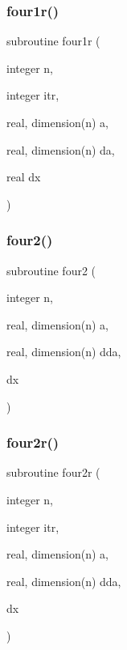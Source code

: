 \mbox{\label{sfft_8f_a5f93a60e103ea341eb2a9178a4914bf5}} 
\subsubsection{\texorpdfstring{four1r()}{four1r()}}
{\footnotesize\ttfamily subroutine four1r (\begin{DoxyParamCaption}\item[{integer}]{n,  }\item[{integer}]{itr,  }\item[{real, dimension(n)}]{a,  }\item[{real, dimension(n)}]{da,  }\item[{real}]{dx }\end{DoxyParamCaption})}

\mbox{\label{sfft_8f_adf0e24e539f85736a86372829a8cb19e}} 
\subsubsection{\texorpdfstring{four2()}{four2()}}
{\footnotesize\ttfamily subroutine four2 (\begin{DoxyParamCaption}\item[{integer}]{n,  }\item[{real, dimension(n)}]{a,  }\item[{real, dimension(n)}]{dda,  }\item[{}]{dx }\end{DoxyParamCaption})}

\mbox{\label{sfft_8f_aaaebfce61bc0b8ffaddcadfb2d679458}} 
\subsubsection{\texorpdfstring{four2r()}{four2r()}}
{\footnotesize\ttfamily subroutine four2r (\begin{DoxyParamCaption}\item[{integer}]{n,  }\item[{integer}]{itr,  }\item[{real, dimension(n)}]{a,  }\item[{real, dimension(n)}]{dda,  }\item[{}]{dx }\end{DoxyParamCaption})}

